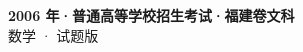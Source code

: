 \documentclass[zihao=-4, a4paper]{ctexart}
\begin{document}
\begin{center}
  {\Large\bfseries 2006 年·普通高等学校招生考试·福建卷文科}\\[4pt]
  {\large 数学 · 试题版}
\end{center}
\medskip
{}

\end{document}
